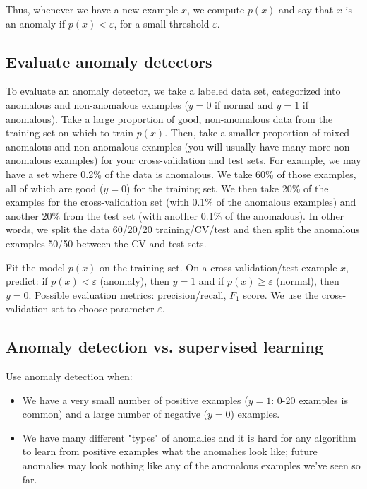 \documentclass[a4paper,11pt]{report}
\begin{document}
Thus, whenever we have a new example $x$, we compute $p(x)$ and say that $x$ is an anomaly if $p(x) < \varepsilon$, for a small threshold $\varepsilon$.

\subsection*{Evaluate anomaly detectors}

To evaluate an anomaly detector, we take a labeled data set, categorized into anomalous and non-anomalous examples ($y = 0$ if normal and $y = 1$ if anomalous). Take a large proportion of good, non-anomalous data from the training set on which to train $p(x)$. Then, take a smaller proportion of mixed anomalous and non-anomalous examples (you will usually have many more non-anomalous examples) for your cross-validation and test sets. For example, we may have a set where 0.2\% of the data is anomalous. We take 60\% of those examples, all of which are good ($y=0$) for the training set. We then take 20\% of the examples for the cross-validation set (with 0.1\% of the anomalous examples) and another 20\% from the test set (with another 0.1\% of the anomalous). In other words, we split the data 60/20/20 training/CV/test and then split the anomalous examples 50/50 between the CV and test sets.

Fit the model $p(x)$ on the training set. On a cross validation/test example $x$, predict: if $p(x) < \varepsilon$ (anomaly), then $y=1$ and if $p(x) ≥ \varepsilon$ (normal), then $y=0$. Possible evaluation metrics: precision/recall, $F_1$ score. We use the cross-validation set to choose parameter $\varepsilon$.

\subsection*{Anomaly detection vs. supervised learning}

Use anomaly detection when:
\begin{itemize}
\item We have a very small number of positive examples ($y=1$: 0-20 examples is common) and a large number of negative ($y=0$) examples.
\item We have many different "types" of anomalies and it is hard for any algorithm to learn from positive examples what the anomalies look like; future anomalies may look nothing like any of the anomalous examples we've seen so far.
\end{itemize}
\end{document}

